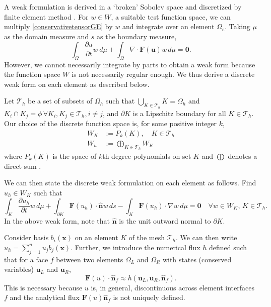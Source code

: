 \documentclass[11pt]{article}
\let\bld\boldsymbol
\begin{document}
A weak formulation is derived in a `broken' Sobolev space and discretized by finite element method \cite{luo_taylor}. For $w \in W$, a suitable test function space, we can multiply \eqref{conservativetensorGE} by $w$ and integrate over an element $\Omega_e$. Taking $\mu$ as the domain measure and $s$ as the boundary measure,
\begin{equation}
\int_{\Omega} \frac{\partial u}{\partial t}w\,d\mu + \int_{\Omega}\nabla\cdot\bld{F(u)}w \,d\mu = \bld{0}.
\end{equation}
However, we cannot necessarily integrate by parts to obtain a weak form because the function space $W$ is not necessarily regular enough. We thus derive a discrete weak form on each element as described below.

Let $\mathcal{T}_h$ be a set of subsets of $\Omega_h$ such that $\bigcup_{K\in \mathcal{T}_h}K = \Omega_h$ and $K_i \cap K_j = \phi \, \forall K_i, K_j \in \mathcal{T}_h, i \neq j$, and $\partial K$ is a Lipschitz boundary for all $K \in \mathcal{T}_h$. Our choice of the discrete function space is, for some positive integer $k$,
\begin{align}
W_{K} &:= P_k(K), \quad K \in \mathcal{T}_h \\
W_h &:= \bigoplus_{K \in \mathcal{T}_h} W_{K}
\end{align}
where $P_k(K)$ is the space of $k$th degree polynomials on set $K$ and $\bigoplus$ denotes a direct sum \cite{nodaldg}.

We can then state the discrete weak formulation on each element as follows. Find $u_h \in W_{K}$ such that
\begin{equation}
\int_{K} \frac{\partial u_h}{\partial t}w\,d\mu + \int_{\partial K} \bld{F}(u_h)\cdot\hat{\bld{n}}w \,ds - \int_{K}\bld{F}(u_h)\cdot\nabla w \,d\mu = \bld{0} \quad \forall w \in W_{K},\, K \in \mathcal{T}_h.
\label{wf}
\end{equation}
In the above weak form, note that $\hat{\bld{n}}$ is the unit outward normal to $\partial K$.

Consider basis $b_i(\bld{x})$ on an element $K$ of the mesh $\mathcal{T}_h$. We can then write $u_h = \sum_{j=1}^n u_j b_j(\bld{x})$. Further, we introduce the numerical flux $h$ defined such that for a face $f$ between two elements $\Omega_L$ and $\Omega_R$ with states (conserved variables) $\bld{u}_L$ and $ \bld{u}_R$,
\begin{equation}
\bld{F}(u)\cdot\hat{\bld{n}}_f \approx h(\bld{u}_L, \bld{u}_R, \hat{\bld{n}}_f).
\end{equation}
This is necessary because $u$ is, in general, discontinuous across element interfaces $f$ and the analytical flux $\bld{F}(u)\hat{\bld{n}}_f$ is not uniquely defined.
\end{document}
